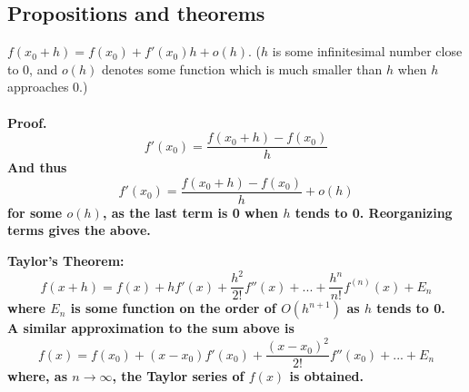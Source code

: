 \documentclass{article}
\begin{document}
\subsection{Propositions and theorems}
\begin{proposition}
$f(x_0 + h) = f(x_0) +  f'(x_0)h + o(h)$. ($h$ is some infinitesimal number close to 0, and $o(h)$ denotes some function which is much smaller than $h$ when $h$ approaches 0.)\\
\\
\bf{Proof.} 
\begin{equation*}
    f'(x_0) =  \frac{f(x_0+h) - f(x_0)}{h}
\end{equation*}
And thus   
\begin{equation*}
    f'(x_0) = \frac{f(x_0+h) - f(x_0)}{h} + o(h)
\end{equation*}
for some $o(h)$, as the last term is 0 when $h$ tends to 0. Reorganizing terms gives the above.

\end{proposition}

\begin{theorem}
\bf{Taylor's Theorem:} 
\begin{equation*}
    f(x+h) = f(x) + hf'(x) + \frac{h^2}{2!}f''(x) + ... + \frac{h^n}{n!}f^{(n)}(x) + E_n
\end{equation*}
where $E_n$ is some function on the order of $O(h^{n+1})$ as $h$ tends to 0.
\\
A similar approximation to the sum above is
\begin{equation*}
f(x) = f(x_0) + (x-x_0)f'(x_0) + \frac{(x-x_0)^2}{2!}f''(x_0) + ... + E_n
\end{equation*}
where, as $n \to \infty$, the Taylor series of $f(x)$ is obtained.
\end{theorem}
\end{document}
